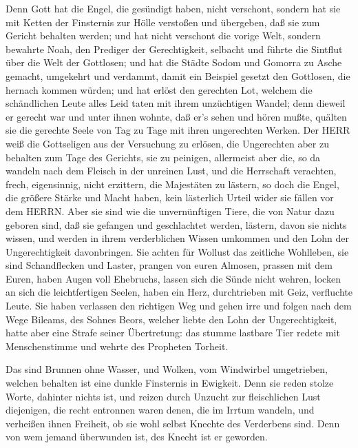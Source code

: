  Denn Gott hat die Engel, die gesündigt haben, nicht
verschont, sondern hat sie mit Ketten der Finsternis zur Hölle verstoßen
und übergeben, daß sie zum Gericht behalten werden;  und hat
nicht verschont die vorige Welt, sondern bewahrte Noah, den Prediger der
Gerechtigkeit, selbacht und führte die Sintflut über die Welt der
Gottlosen;  und hat die Städte Sodom und Gomorra zu Asche
gemacht, umgekehrt und verdammt, damit ein Beispiel gesetzt den
Gottlosen, die hernach kommen würden;  und hat erlöst den
gerechten Lot, welchem die schändlichen Leute alles Leid taten mit ihrem
unzüchtigen Wandel;  denn dieweil er gerecht war und unter
ihnen wohnte, daß er's sehen und hören mußte, quälten sie die gerechte
Seele von Tag zu Tage mit ihren ungerechten Werken.  Der
HERR weiß die Gottseligen aus der Versuchung zu erlösen, die Ungerechten
aber zu behalten zum Tage des Gerichts, sie zu peinigen, 
allermeist aber die, so da wandeln nach dem Fleisch in der unreinen
Lust, und die Herrschaft verachten, frech, eigensinnig, nicht erzittern,
die Majestäten zu lästern,  so doch die Engel, die größere
Stärke und Macht haben, kein lästerlich Urteil wider sie fällen vor dem
HERRN.  Aber sie sind wie die unvernünftigen Tiere, die von
Natur dazu geboren sind, daß sie gefangen und geschlachtet werden,
lästern, davon sie nichts wissen, und werden in ihrem verderblichen
Wissen umkommen  und den Lohn der Ungerechtigkeit
davonbringen. Sie achten für Wollust das zeitliche Wohlleben, sie sind
Schandflecken und Laster, prangen von euren Almosen, prassen mit dem
Euren,  haben Augen voll Ehebruchs, lassen sich die Sünde
nicht wehren, locken an sich die leichtfertigen Seelen, haben ein Herz,
durchtrieben mit Geiz, verfluchte Leute.  Sie haben
verlassen den richtigen Weg und gehen irre und folgen nach dem Wege
Bileams, des Sohnes Beors, welcher liebte den Lohn der Ungerechtigkeit,
 hatte aber eine Strafe seiner Übertretung: das stumme
lastbare Tier redete mit Menschenstimme und wehrte des Propheten
Torheit.

 Das sind Brunnen ohne Wasser, und Wolken, vom Windwirbel
umgetrieben, welchen behalten ist eine dunkle Finsternis in Ewigkeit.
 Denn sie reden stolze Worte, dahinter nichts ist, und
reizen durch Unzucht zur fleischlichen Lust diejenigen, die recht
entronnen waren denen, die im Irrtum wandeln,  und
verheißen ihnen Freiheit, ob sie wohl selbst Knechte des Verderbens
sind. Denn von wem jemand überwunden ist, des Knecht ist er geworden.

